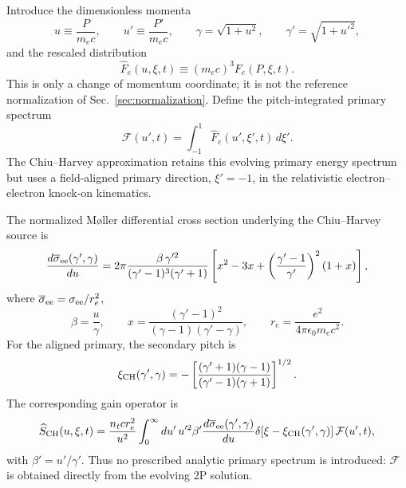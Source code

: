 \documentclass[11pt]{article}
\begin{document}
Introduce the dimensionless momenta
\begin{equation}
 u\equiv\frac{P}{m_ec},\qquad
 u'\equiv\frac{P'}{m_ec},\qquad
 \gamma=\sqrt{1+u^2},\qquad
 \gamma'=\sqrt{1+u'^2},
 \label{eq:ch_auxiliary_momenta}
\end{equation}
and the rescaled distribution
\begin{equation}
 \widehat F_e(u,\xi,t)\equiv(m_ec)^3F_e(P,\xi,t).
 \label{eq:ch_hat_definition}
\end{equation}
This is only a change of momentum coordinate; it is not the reference normalization of
Sec.~\ref{sec:normalization}.  Define the pitch-integrated primary spectrum
\begin{equation}
 \boxed{
 \mathcal F(u',t)=\int_{-1}^{1}\widehat F_e(u',\xi',t)\,d\xi'.
 }
 \label{eq:ch_primary_spectrum}
\end{equation}
The Chiu--Harvey approximation retains this evolving primary energy spectrum but uses a
field-aligned primary direction, $\xi'=-1$, in the relativistic electron--electron
knock-on kinematics.

The normalized M{\o}ller differential cross section underlying the Chiu--Harvey source is
\cite{Moller1932,Chiu1998,Harvey2000}
\begin{equation}
 \frac{d\overline\sigma_{\rm ee}(\gamma',\gamma)}{du}
 =2\pi
 \frac{\beta\,\gamma'^2}{(\gamma'-1)^3(\gamma'+1)}
 \left[
  x^2-3x+\left(\frac{\gamma'-1}{\gamma'}\right)^2(1+x)
 \right],
 \label{eq:ch_knockon_cross_section}
\end{equation}
where $\overline\sigma_{\rm ee}=\sigma_{\rm ee}/r_e^2$,
\begin{equation}
 \beta=\frac{u}{\gamma},\qquad
 x=\frac{(\gamma'-1)^2}{(\gamma-1)(\gamma'-\gamma)},\qquad
 r_e=\frac{e^2}{4\pi\epsilon_0m_ec^2}.
 \label{eq:ch_knockon_cross_section_aux}
\end{equation}
For the aligned primary, the secondary pitch is
\begin{equation}
 \xi_{\rm CH}(\gamma',\gamma)
 =-\left[
  \frac{(\gamma'+1)(\gamma-1)}{(\gamma'-1)(\gamma+1)}
 \right]^{1/2}.
 \label{eq:ch_secondary_pitch}
\end{equation}
The corresponding gain operator is
\begin{equation}
 \widehat S_{\rm CH}(u,\xi,t)
 =\frac{n_t c r_e^2}{u^2}
  \int_0^\infty du'\,u'^2\beta'
  \frac{d\overline\sigma_{\rm ee}(\gamma',\gamma)}{du}
  \delta\!\left[\xi-\xi_{\rm CH}(\gamma',\gamma)\right]
  \mathcal F(u',t),
 \label{eq:ch_integral_source}
\end{equation}
with $\beta'=u'/\gamma'$.  Thus no prescribed analytic primary spectrum is introduced:
$\mathcal F$ is obtained directly from the evolving 2P solution.
\end{document}
